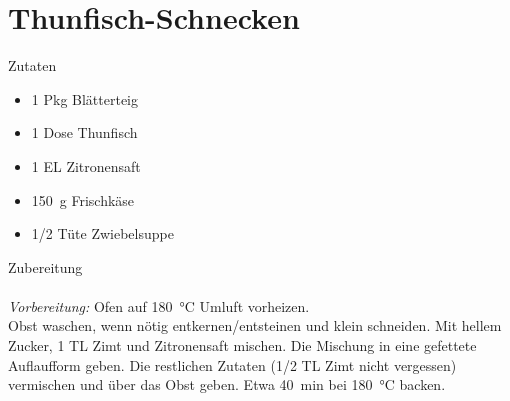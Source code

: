 \section*{Thunfisch-Schnecken}
\ihead{}\ohead{}
\cfoot{}
{\Large Zutaten}
\begin{multicols}{2}
\begin{itemize}
    \item \num{1} Pkg Blätterteig
    \item \num{1} Dose Thunfisch
    \item \num{1} EL Zitronensaft
    \item \SI{150}{g} Frischkäse
    \item \num{1/2} Tüte Zwiebelsuppe
\end{itemize}
\end{multicols}
\noindent
{\Large Zubereitung}\\
\\
\textit{Vorbereitung:} Ofen auf \SI{180}{\celsius} Umluft vorheizen.\\
Obst waschen, wenn nötig entkernen/entsteinen und klein schneiden.
Mit hellem Zucker, \num{1} TL Zimt und Zitronensaft mischen.
Die Mischung in eine gefettete Auflaufform geben. 
Die restlichen Zutaten (\num{1/2} TL Zimt nicht vergessen) vermischen und über das Obst geben.
Etwa \SI{40}{min} bei \SI{180}{\celsius} backen.